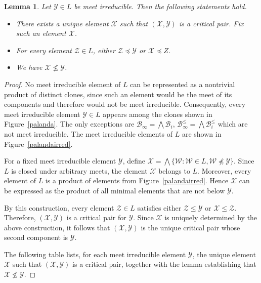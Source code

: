 \documentclass{amsart}
\numberwithin{equation}{section}
\theoremstyle{plain}
\newtheorem{lemma}[theorem]{Lemma}
\theoremstyle{definition}
\def\clone#1{\mathcal{#1}}
\def\Bc{\clone{B}}
\begin{document}
\begin{lemma}
\label{allineq}
  Let $\clone{Y}\in L$ be meet irreducible. Then the following statements hold.
\begin{itemize}
\item There exists a unique element $\clone{X}$ such that $(\clone{X},\clone{Y})$ is a critical pair. Fix such an element $\clone{X}$.
\item For every element $\clone{Z}\in L$, either $\clone{Z}\preceq \clone{Y}$ or $\clone{X}\preceq Z$.
\item We have $\clone{X}\not\leq \clone{Y}$.
\end{itemize}
\end{lemma}
\begin{proof} 
No meet irreducible element of $L$ can be represented as a nontrivial product of distinct clones, since such an element would be the meet of its components and therefore would not be meet irreducible.
 Consequently, every meet irreducible element $\clone{Y}\in L$ appears among the clones shown in Figure~\ref{palanda}.
 The only exceptions are
$\Bc_\infty = \bigwedge \Bc_i$, $\Bc_\infty^\leq = \bigwedge \Bc_i^\leq$ which are not meet irreducible. The meet irreducible elements of $L$ are shown in Figure~\ref{palandairred}.

\begin{figure}
\end{figure}

For a fixed meet irreducible element $\clone{Y}$, define $\clone{X} = \bigwedge \{\clone{W}:\clone{W}\in L,\clone{W}\not\preceq \clone{Y}\}$. 
Since $L$ is closed under arbitrary meets, the element $\clone{X}$ belongs to $L$. Moreover, every element of $L$ is a product of elements from Figure~\ref{palandairred}. Hence $\clone{X}$ can be expressed as the product of all minimal elements that are not below $\clone{Y}$.

By this construction, every element $\clone{Z}\in L$ satisfies either $\clone{Z}\leq \clone{Y}$ or $\clone{X}\leq \clone{Z}$.
Therefore, $(\clone{X},\clone{Y})$ is a critical pair for $\clone{Y}$. Since $\clone{X}$ is uniquely determined by the above construction, it follows that $(\clone{X},\clone{Y})$ is the unique critical pair whose second component is $\clone{Y}$.

The following table lists, for each meet irreducible element $\clone{Y}$, the unique element $\clone{X}$ such that $(\clone{X},\clone{Y})$ is a critical pair, together with the lemma establishing that $\clone{X}\not\leq\clone{Y}$.


\end{proof}
\end{document}
